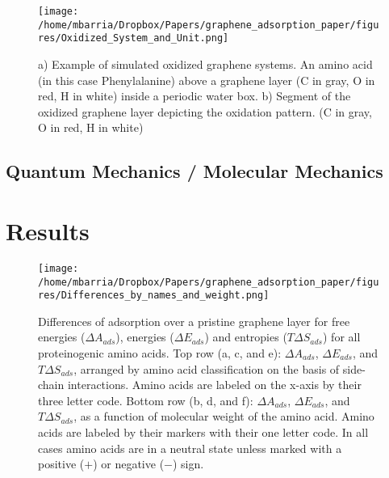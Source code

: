 \documentclass[twoside,twocolumn,9pt]{article}
\begin{document}
\begin{figure}[htbp]
\centerline{\texttt{[image: /home/mbarria/Dropbox/Papers/graphene\_adsorption\_paper/figures/Oxidized\_System\_and\_Unit.png]}}
\caption[]{\label{fig:system-oxidized} a) Example of simulated oxidized
  graphene systems. An amino acid (in this case Phenylalanine) above a
  graphene layer (C in gray, O in red, H in white) inside a periodic
  water box. b) Segment of the oxidized graphene layer depicting the
  oxidation pattern. (C in gray, O in red, H in white)}
\end{figure}

\subsection{Quantum Mechanics / Molecular Mechanics}

\section{Results}

\begin{figure*}[htbp]
\centerline{\texttt{[image: /home/mbarria/Dropbox/Papers/graphene\_adsorption\_paper/figures/Differences\_by\_names\_and\_weight.png]}}
\caption[]{\label{fig:differences} Differences of adsorption over a
  pristine graphene layer for free energies ($\Delta A_{ads}$),
  energies ($\Delta E_{ads}$) and entropies ($T \Delta S_{ads}$) for
  all proteinogenic amino acids. Top row (a, c, and e):
  $\Delta A_{ads}$, $\Delta E_{ads}$, and $T \Delta S_{ads}$, arranged
  by amino acid classification on the basis of side-chain
  interactions. Amino acids are labeled on the x-axis by their three
  letter code. Bottom row (b, d, and f): $\Delta A_{ads}$,
  $\Delta E_{ads}$, and $T \Delta S_{ads}$, as a function of molecular
  weight of the amino acid. Amino acids are labeled by their markers
  with their one letter code. In all cases amino acids are in a
  neutral state unless marked with a positive ($+$) or negative ($-$)
  sign.}

\end{figure*}
\end{document}
